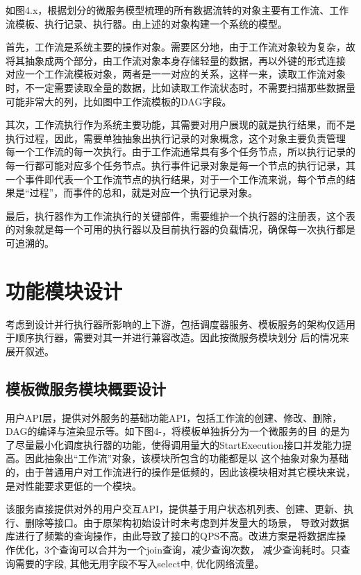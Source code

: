 如图4.x，根据划分的微服务模型梳理的所有数据流转的对象主要有工作流、工作流模板、执行记录、执行器。由上述的对象构建一个系统的模型。

首先，工作流是系统主要的操作对象。需要区分地，由于工作流对象较为复杂，故将其抽象成两个部分，由工作流对象本身存储轻量的数据，再以外键的形式连接
对应一个工作流模板对象，两者是一一对应的关系，这样一来，读取工作流对象时，不一定需要读取全量的数据，比如读取工作流状态时，不需要扫描那些数据量
可能非常大的列，比如图中工作流模板的DAG字段。

其次，工作流执行作为系统主要功能，其需要对用户展现的就是执行结果，而不是执行过程，因此，需要单独抽象出执行记录的对象概念，这个对象主要负责管理
每一个工作流的每一次执行。由于工作流通常具有多个任务节点，所以执行记录的每一行都可能对应多个任务节点。执行事件记录对象是每一个节点的执行记录，其
一个事件即代表一个工作流节点的执行结果，对于一个工作流来说，每个节点的结果是“过程”，而事件的总和，就是对应一个执行记录对象。

最后，执行器作为工作流执行的关键部件，需要维护一个执行器的注册表，这个表的对象就是每一个可用的执行器以及目前执行器的负载情况，确保每一次执行都是
可追溯的。

\section{功能模块设计}
考虑到设计并行执行器所影响的上下游，包括调度器服务、模板服务的架构仅适用于顺序执行器，需要对其一并进行兼容改造。因此按微服务模块划分
后的情况来展开叙述。


\subsection{模板微服务模块概要设计}

用户API层，提供对外服务的基础功能API，包括工作流的创建、修改、删除，DAG的编译与渲染显示等。如下图4-，将模板单独拆分为一个微服务的目
的是为了尽量最小化调度执行器的功能，使得调用量大的StartExecution接口并发能力提高。因此抽象出“工作流”对象，该模块所包含的功能都是以
这个抽象对象为基础的，由于普通用户对工作流进行的操作是低频的，因此该模块相对其它模块来说，是对性能要求更低的一个模块。

该服务直接提供对外的用户交互API，提供基于用户状态机列表、创建、更新、执行、删除等接口。由于原架构初始设计时未考虑到并发量大的场景，
导致对数据库进行了频繁的查询操作，由此导致了接口的QPS不高。改进方案是将数据库操作优化，3个查询可以合并为一个join查询，减少查询次数，
减少查询耗时。只查询需要的字段, 其他无用字段不写入select中, 优化网络流量。

